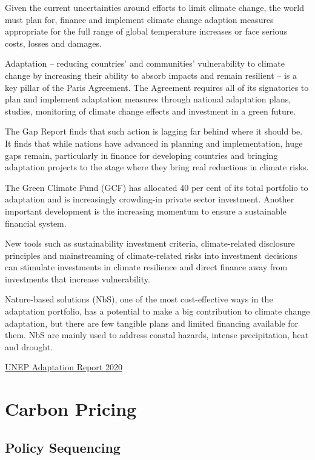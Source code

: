 \documentclass[
]{book}
\begin{document}
Given the current uncertainties around efforts to limit climate change,
the world must plan for, finance and implement climate change adaption measures
appropriate for the full range of global temperature increases or
face serious costs, losses and damages.

Adaptation -- reducing countries' and communities' vulnerability to climate change
by increasing their ability to absorb impacts and remain resilient --
is a key pillar of the Paris Agreement.
The Agreement requires all of its signatories to plan and implement adaptation measures
through national adaptation plans, studies, monitoring of climate change effects and
investment in a green future.

The Gap Report finds that such action is lagging far behind where it should be.
It finds that while nations have advanced in planning and implementation, huge gaps remain,
particularly in finance for developing countries and
bringing adaptation projects to the stage where they bring real reductions in climate risks.

The Green Climate Fund (GCF) has allocated 40 per
cent of its total portfolio to adaptation and is increasingly crowding-in private sector investment.
Another important development is the increasing momentum to ensure a sustainable financial
system.

New tools such as sustainability investment criteria, climate-related disclosure principles
and mainstreaming of climate-related risks into investment decisions can stimulate investments in
climate resilience and direct finance away from investments that increase vulnerability.

Nature-based solutions (NbS), one of the most cost-effective ways in the adaptation portfolio, has
a potential to make a big contribution to climate change adaptation, but there are few tangible
plans and limited financing available for them.
NbS are mainly used to address coastal hazards, intense precipitation, heat and
drought.

\href{https://www.unep.org/resources/adaptation-gap-report-2020}{UNEP Adaptation Report 2020}

\hypertarget{carbon-pricing}{%
\chapter{Carbon Pricing}\label{carbon-pricing}}

\hypertarget{policy-sequencing}{%
\section{Policy Sequencing}\label{policy-sequencing}}
\end{document}
